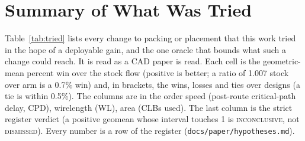 \section{Summary of What Was Tried}
\label{sec:summary}

Table~\ref{tab:tried} lists every change to packing or placement that this work tried in the hope of a deployable gain, and the one oracle that bounds what such a change could reach. It is read as a CAD paper is read. Each cell is the geometric-mean percent win over the stock flow (positive is better; a ratio of 1.007 stock over arm is a 0.7\% win) and, in brackets, the wins, losses and ties over designs (a tie is within 0.5\%). The columns are in the order speed (post-route critical-path delay, CPD), wirelength (WL), area (CLBs used). The last column is the strict register verdict (a positive geomean whose interval touches 1 is \textsc{inconclusive}, not \textsc{dismissed}). Every number is a row of the register (\texttt{docs/paper/hypotheses.md}).

